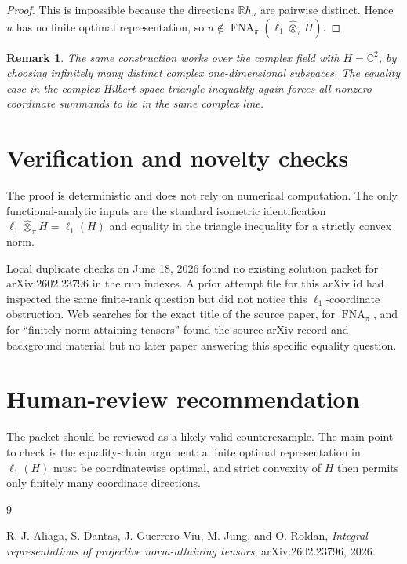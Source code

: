 \documentclass[11pt]{article}
\newtheorem{remark}{Remark}
\newcommand{\FNA}{\operatorname{FNA}}
\newcommand{\R}{\mathbb{R}}
\newcommand{\whot}{\widehat{\otimes}_{\pi}}
\begin{document}
\begin{proof}
This is impossible because the directions \(\R h_n\) are pairwise distinct.
Hence \(u\) has no finite optimal representation, so
\(u\notin \FNA_{\pi}(\ell_1\whot H)\).
\end{proof}

\begin{remark}
The same construction works over the complex field with \(H=\mathbb{C}^2\), by
choosing infinitely many distinct complex one-dimensional subspaces.  The
equality case in the complex Hilbert-space triangle inequality again forces all
nonzero coordinate summands to lie in the same complex line.
\end{remark}

\section*{Verification and novelty checks}

The proof is deterministic and does not rely on numerical computation.  The
only functional-analytic inputs are the standard isometric identification
\(\ell_1\whot H=\ell_1(H)\) and equality in the triangle inequality for a
strictly convex norm.

Local duplicate checks on June 18, 2026 found no existing solution packet for
arXiv:2602.23796 in the run indexes.  A prior attempt file for this arXiv id
had inspected the same finite-rank question but did not notice this
\(\ell_1\)-coordinate obstruction.  Web searches for the exact title of the
source paper, for \(\FNA_\pi\), and for ``finitely norm-attaining tensors''
found the source arXiv record and background material but no later paper
answering this specific equality question.

\section*{Human-review recommendation}

The packet should be reviewed as a likely valid counterexample.  The main
point to check is the equality-chain argument: a finite optimal representation
in \(\ell_1(H)\) must be coordinatewise optimal, and strict convexity of \(H\)
then permits only finitely many coordinate directions.

\begin{thebibliography}{9}

R. J. Aliaga, S. Dantas, J. Guerrero-Viu, M. Jung, and O. Roldan,
\emph{Integral representations of projective norm-attaining tensors},
arXiv:2602.23796, 2026.

\end{thebibliography}
\end{document}
